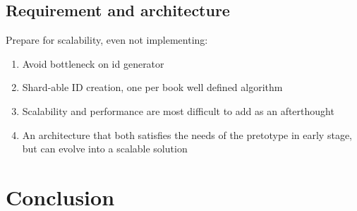 \documentclass[a4paper,10pt]{article}
\begin{document}
\subsection{Requirement and architecture}
Prepare for scalability, even not implementing:
\begin{enumerate}
\item Avoid bottleneck on id generator
\item Shard-able ID creation, one per book well defined algorithm
\item Scalability and performance are most difficult to add as an afterthought
\item An architecture that both satisfies the needs of the pretotype in early stage, but can evolve
    into a scalable solution
\end{enumerate}


\section{Conclusion}
\end{document}
